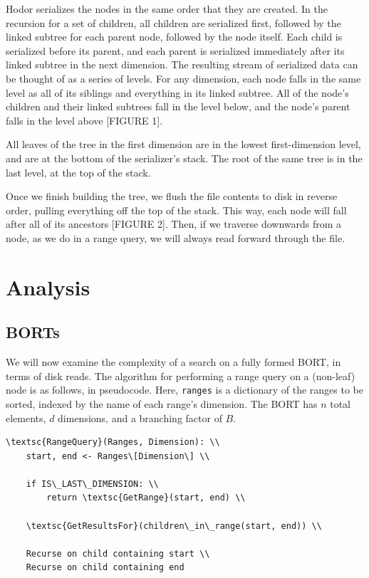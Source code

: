 \documentclass[11pt, oneside]{article}
\newcommand{\ms}{\texttt}
\begin{document}
Hodor serializes the nodes in the same order that they are created. In the
recursion for a set of children, all children are serialized first, followed by
the linked subtree for each parent node, followed by the node itself. Each child
is serialized before its parent, and each parent is serialized immediately after
its linked subtree in the next dimension. The resulting stream of serialized
data can be thought of as a series of levels. For any dimension, each node falls
in the same level as all of its siblings and everything in its linked subtree.
All of the node's children and their linked subtrees fall in the level below,
and the node's parent falls in the level above [FIGURE 1]. 

All leaves of the tree in the first dimension are in the lowest first-dimension
level, and are at the bottom of the serializer's stack. The root of the same
tree is in the last level, at the top of the stack.

Once we finish building the tree, we flush the file contents to disk in reverse
order, pulling everything off the top of the stack. This way, each node will
fall after all of its ancestors [FIGURE 2]. Then, if we traverse downwards from
a node, as we do in a range query, we will always read forward through the file. 

\section{Analysis}


\subsection{BORTs}

We will now examine the complexity of a search on a fully formed BORT, in terms
of disk reads. The algorithm for performing a range query on a (non-leaf) node
is as follows, in pseudocode. Here, \ms{ranges} is a dictionary of the
ranges to be sorted, indexed by the name of each range's dimension. The BORT has
$n$ total elements, $d$ dimensions, and a branching factor of $B$.

\begin{verbatim}
\textsc{RangeQuery}(Ranges, Dimension): \\
    start, end <- Ranges\[Dimension\] \\
    
    if IS\_LAST\_DIMENSION: \\
        return \textsc{GetRange}(start, end) \\

    \textsc{GetResultsFor}(children\_in\_range(start, end)) \\

    Recurse on child containing start \\
    Recurse on child containing end
\end{verbatim}
\end{document}
